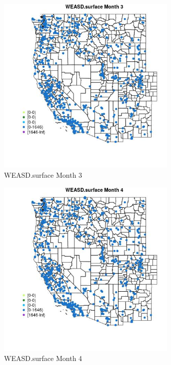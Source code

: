 \begin{figure} 
\centering  
\includegraphics[width=0.77\textwidth]{Code_Outputs/Report_ML_input_PM25_Step4_part_e_de_duplicated_aves_compiled_2019-05-21wNAs_MapObsMo3WEASDsurface.jpg} 
\caption{\label{fig:Report_ML_input_PM25_Step4_part_e_de_duplicated_aves_compiled_2019-05-21wNAsMapObsMo3WEASDsurface}WEASD.surface Month 3} 
\end{figure} 
 

\begin{figure} 
\centering  
\includegraphics[width=0.77\textwidth]{Code_Outputs/Report_ML_input_PM25_Step4_part_e_de_duplicated_aves_compiled_2019-05-21wNAs_MapObsMo4WEASDsurface.jpg} 
\caption{\label{fig:Report_ML_input_PM25_Step4_part_e_de_duplicated_aves_compiled_2019-05-21wNAsMapObsMo4WEASDsurface}WEASD.surface Month 4} 
\end{figure} 
 

